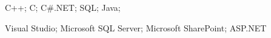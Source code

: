 \begin{cventries}
  \cventry
    {}
    {}
    {}
    {}
    {
      \begin{cvitems}
        \item {C++; C; C\#.NET; SQL; Java;}
        \item {Visual Studio; Microsoft SQL Server; Microsoft SharePoint; ASP.NET}
      \end{cvitems}
    }
\end{cventries}
